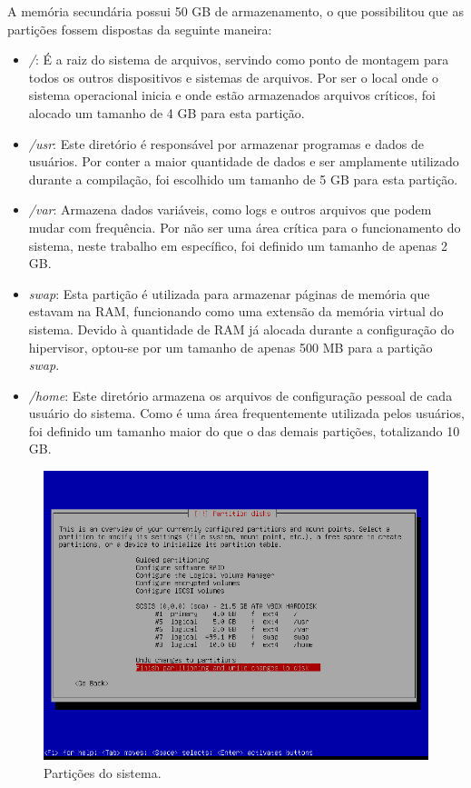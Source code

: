 \documentclass[
	12pt,				%
	oneside,   	        %
	a4paper,			%
	english,			%
	french,				%
	spanish,			%
	brazil,				%
	]{pacotes/abntex2}
\begin{document}
A memória secundária possui 50 GB de armazenamento, o que possibilitou que as partições fossem dispostas da seguinte maneira:

\begin{itemize}
    \item \textit{/}: É a raiz do sistema de arquivos, servindo como ponto de montagem para todos os outros dispositivos e sistemas de arquivos. Por ser o local onde o sistema operacional inicia e onde estão armazenados arquivos críticos, foi alocado um tamanho de 4 GB para esta partição.
    
    \item \textit{/usr}: Este diretório é responsável por armazenar programas e dados de usuários. Por conter a maior quantidade de dados e ser amplamente utilizado durante a compilação, foi escolhido um tamanho de 5 GB para esta partição.
    
    \item \textit{/var}: Armazena dados variáveis, como logs e outros arquivos que podem mudar com frequência. Por não ser uma área crítica para o funcionamento do sistema, neste trabalho em específico, foi definido um tamanho de apenas 2 GB.
    
    \item \textit{swap}: Esta partição é utilizada para armazenar páginas de memória que estavam na RAM, funcionando como uma extensão da memória virtual do sistema. Devido à quantidade de RAM já alocada durante a configuração do hipervisor, optou-se por um tamanho de apenas 500 MB para a partição \textit{swap}.
    
    \item \textit{/home}: Este diretório armazena os arquivos de configuração pessoal de cada usuário do sistema. Como é uma área frequentemente utilizada pelos usuários, foi definido um tamanho maior do que o das demais partições, totalizando 10 GB.
\end{itemize}

\begin{figure}[H]
  \centering
  \includegraphics[scale=0.7]{figuras/partition.png}
  \caption{Partições do sistema.}
  \label{fig:partition}
\end{figure}
\end{document}

